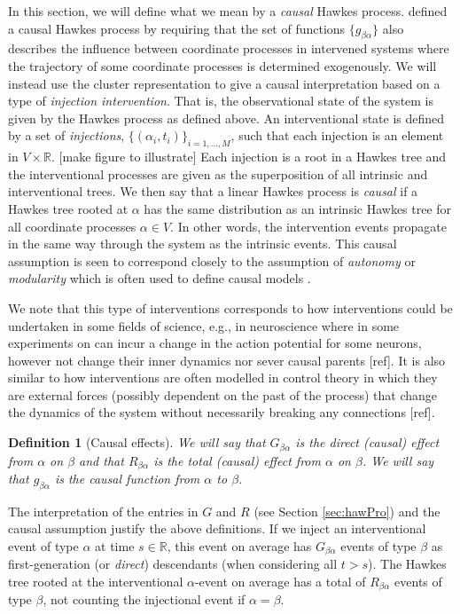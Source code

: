 \documentclass[accepted]{uai2021} %
\newtheorem{defn}[thm]{Definition}
\begin{document}
In this section, we will define what we mean by a {\it causal} Hawkes process. 
\cite{mogensenUAI2020} defined a causal Hawkes process by requiring that the 
set 
of functions $\{g_{\beta\alpha}\}$ also describes the influence between 
coordinate processes in intervened systems where the trajectory of some 
coordinate processes is determined exogenously. We will instead use the cluster 
representation to give a causal
interpretation based on a type of \emph{injection intervention}. That is, the 
observational state of the system is given by the Hawkes process as defined 
above. An interventional state is defined by a set of \emph{injections}, 
$\{(\alpha_i, t_i) \}_{i =1,\ldots, M} $, such that each injection is an 
element in $V\times \mathbb{R}$. [make figure to illustrate] Each injection is 
a root in a Hawkes tree and the interventional processes are given as the 
superposition of all intrinsic and interventional trees. We then say that a 
linear Hawkes process is {\it 
causal} if a Hawkes tree rooted at $\alpha$ has the same distribution as an 
intrinsic Hawkes tree for all coordinate processes $\alpha \in V$. In 
other words, the intervention events 
propagate in the same way through the system as the intrinsic events. This 
causal assumption is seen to correspond closely to 
the assumption of \emph{autonomy} or \emph{modularity} which is often used to 
define causal models 
\citep{pearl2009, petersElements2017}.

We note that this type of interventions corresponds to how interventions could 
be undertaken in some fields of 
science, e.g., in neuroscience where in some experiments on can incur a change 
in the 
action potential for some neurons, however not change their inner dynamics nor 
sever causal parents [ref]. It is also similar to how interventions are often 
modelled in control theory in which they are external forces (possibly 
dependent on the past of the process) that change the dynamics of the system 
without necessarily breaking any connections [ref].

\begin{defn}[Causal effects]
	We will say that $G_{\beta\alpha}$ is the \emph{direct (causal) effect} 
	from 
	$\alpha$ on $\beta$ and that $R_{\beta\alpha}$ is the \emph{total (causal) 
	effect} from $\alpha$ on $\beta$. We will say that $g_{\beta\alpha}$ is the 
	{\it causal function} from $\alpha$ to $\beta$.
	\label{def:cauEff}
\end{defn}

The interpretation of the entries in $G$ and $R$ (see Section 
\ref{sec:hawPro}) and the causal assumption justify the above definitions. If 
we inject an 
interventional event of type $\alpha$ at time $s \in \mathbb{R}$, this 
event on average has $G_{\beta\alpha}$ events 
of type $\beta$ as first-generation (or \emph{direct}) descendants (when 
considering all $t > s$). The Hawkes tree rooted at the 
interventional $\alpha$-event on average has a total of $R_{\beta\alpha}$ 
events of 
type $\beta$, not counting the injectional event if $\alpha=\beta$. 
\end{document}
